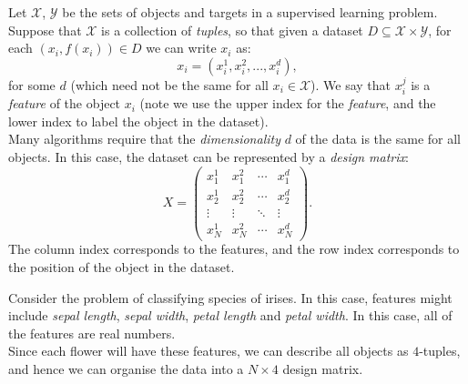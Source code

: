 \begin{framedef}
Let $\mathcal{X}$, $\mathcal{Y}$ be the sets of objects and targets in a supervised learning problem. Suppose that $\mathcal{X}$ is a collection of \textit{tuples}, so that given a dataset $D \subseteq \mathcal{X} \times \mathcal{Y}$, for each $(x_i,f(x_i)) \in D$ we can write $x_i$ as:
\begin{equation*}
x_i = (x_i^1,x_i^2,...,x_i^d),
\end{equation*}
for some $d$ (which need not be the same for all $x_i \in \mathcal{X}$). We say that $x_i^j$ is a \textit{feature} of the object $x_i$ (note we use the upper index for the \textit{feature}, and the lower index to label the object in the dataset).\\

Many algorithms require that the \textit{dimensionality} $d$ of the data is the same for all objects. In this case, the dataset can be represented by a \textit{design matrix}:
\begin{equation*}
X = \begin{pmatrix} x_1^1 & x_1^2 & \cdots & x_1^d \\ x_2^1 & x_2^2 & \cdots & x_2^d \\ \vdots & \vdots & \ddots & \vdots \\ x_N^1 & x_N^2 & \cdots & x_N^d \end{pmatrix}.
\end{equation*}
The column index corresponds to the features, and the row index corresponds to the position of the object in the dataset.
\end{framedef}

\begin{frameex}
Consider the problem of classifying species of irises. In this case, features might include \textit{sepal length}, \textit{sepal width}, \textit{petal length} and \textit{petal width}. In this case, all of the features are real numbers.\\

Since each flower will have these features, we can describe all objects as $4$-tuples, and hence we can organise the data into a $N \times 4$ design matrix.
\end{frameex}


